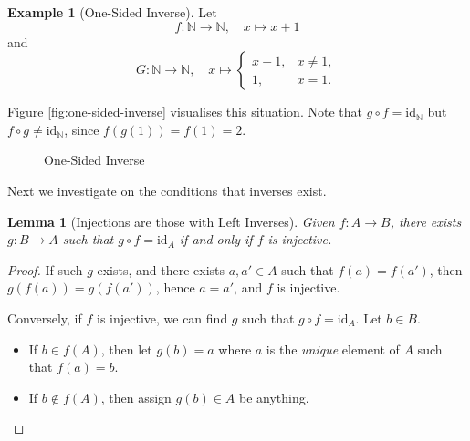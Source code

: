 \documentclass{article}
\newtheorem{lemma}[theorem]{Lemma}
\theoremstyle{definition}
\newtheorem{example}[theorem]{Example}
\theoremstyle{remark}
\newcommand{\pqty}[1]{\left(#1\right)}
\newcommand{\functiondomain}[3]{#1:#2\to #3}
\newcommand{\function}[5]{#1:#2\to #3,\quad #4\mapsto #5}
\newcommand{\identity}{\mathrm{id}}
\newcommand{\NN}{\mathbb{N}}
\begin{document}
\begin{example}[One-Sided Inverse]
    Let
    \[
        \function{f}{\NN}{\NN}{x}{x + 1}
    \]
    and
    \[
        \function{G}{\NN}{\NN}{x}{\begin{cases}x - 1, & x \neq 1, \\ 1, & x = 1.\end{cases}}
    \]

    Figure \autoref{fig:one-sided-inverse} visualises this situation. Note that \(g \circ f = \identity_{\NN}\) but \(f \circ g \neq \identity_{\NN}\), since \(f \pqty{g\pqty{1}} = f\pqty{1} = 2\).
\end{example}

\begin{figure}[ht!]
    \centering
    \caption{One-Sided Inverse}
    \label{fig:one-sided-inverse}
\end{figure}

Next we investigate on the conditions that inverses exist.

\begin{lemma}[Injections are those with Left Inverses]
    Given \(\functiondomain{f}{A}{B}\), there exists \(\functiondomain{g}{B}{A}\) such that \(g \circ f = \identity_A\) if and only if \(f\) is injective.
\end{lemma}

\begin{proof}
    If such \(g\) exists, and there exists \(a, a' \in A\) such that \(f \pqty{a} = f \pqty{a'}\), then \(g \pqty{f \pqty{a}} = g \pqty{f \pqty{a'}}\), hence \(a = a'\), and \(f\) is injective.

    Conversely, if \(f\) is injective, we can find \(g\) such that \(g \circ f = \identity_A\). Let \(b \in B\).
    \begin{itemize}
        \item If \(b \in f\pqty{A}\), then let \(g \pqty{b} = a\) where \(a\) is the \emph{unique} element of \(A\) such that \(f\pqty{a} = b\).
        \item If \(b \notin f\pqty{A}\), then assign \(g \pqty{b} \in A\) be anything.
    \end{itemize}
\end{proof}
\end{document}
